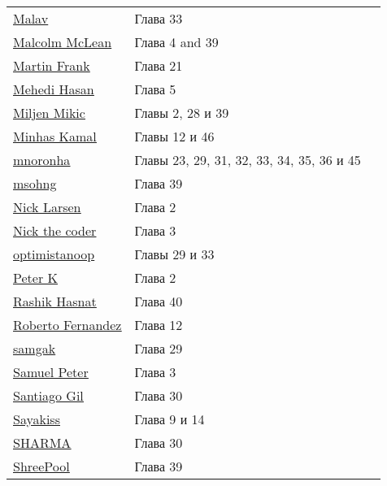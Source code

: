 \newpage
\vspace{\baselineskip}
\begin{tabular}{p{}ll}
\href{https://stackoverflow.com/users/3572733/}{\underline{Malav}} & Глава 33 \\
\href{https://stackoverflow.com/users/3310281/}{\underline{Malcolm McLean}} & Глава 4 and 39 \\
\href{https://stackoverflow.com/users/2910751/}{\underline{Martin Frank}} & Глава 21 \\
\href{https://stackoverflow.com/users/2176115/}{\underline{Mehedi Hasan}} & Глава 5 \\
\href{https://stackoverflow.com/users/1460628/}{\underline{Miljen Mikic}} & Главы 2, 28 и 39 \\
\href{https://stackoverflow.com/users/4684058/}{\underline{Minhas Kamal}} & Главы 12 и 46 \\
\href{https://stackoverflow.com/users/2608433/}{\underline{mnoronha}} & Главы 23, 29, 31, 32, 33, 34, 35, 36 и 45 \\
\href{https://stackoverflow.com/users/3208967/}{\underline{msohng}} & Глава 39 \\
\href{https://stackoverflow.com/users/178082/}{\underline{Nick Larsen}} & Глава 2 \\
\href{https://stackoverflow.com/users/4298392/}{\underline{Nick the coder}} & Глава 3 \\
\href{https://stackoverflow.com/users/3566045/}{\underline{optimistanoop}} & Главы 29 и 33 \\
\href{https://stackoverflow.com/users/4896952/}{\underline{Peter K}} & Глава 2 \\
\href{https://stackoverflow.com/users/6400629/}{\underline{Rashik Hasnat}} & Глава 40 \\
\href{https://stackoverflow.com/users/4110708/}{\underline{Roberto Fernandez}} & Глава 12 \\
\href{https://stackoverflow.com/users/696391/}{\underline{samgak}} & Глава 29 \\
\href{https://stackoverflow.com/users/2510655/}{\underline{Samuel Peter}} & Глава 3 \\
\href{https://stackoverflow.com/users/5379399/}{\underline{Santiago Gil}} & Глава 30 \\
\href{https://stackoverflow.com/users/1291716/}{\underline{Sayakiss}} & Глава 9 и 14 \\
\href{https://stackoverflow.com/users/3465421/}{\underline{SHARMA}} & Глава 30 \\
\href{https://stackoverflow.com/users/5956891/}{\underline{ShreePool}} & Глава 39 \\

\end{tabular}
